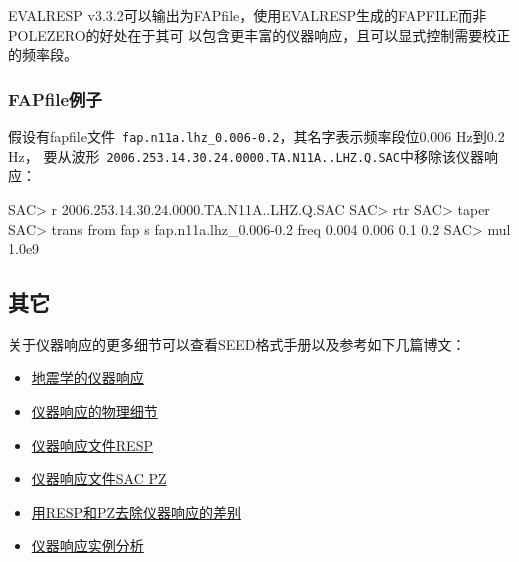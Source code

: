EVALRESP v3.3.2可以输出为FAPfile，使用EVALRESP生成的FAPFILE而非POLEZERO的好处在于其可
以包含更丰富的仪器响应，且可以显式控制需要校正的频率段。

\subsubsection{FAPfile例子}
假设有fapfile文件~\lstinline{fap.n11a.lhz_0.006-0.2}，其名字表示频率段位0.006 Hz到0.2 Hz，
要从波形~\lstinline{2006.253.14.30.24.0000.TA.N11A..LHZ.Q.SAC}中移除该仪器响应：
\begin{SACCode}
SAC> r 2006.253.14.30.24.0000.TA.N11A..LHZ.Q.SAC
SAC> rtr
SAC> taper
SAC> trans from fap s fap.n11a.lhz_0.006-0.2 freq 0.004 0.006 0.1 0.2
SAC> mul 1.0e9
\end{SACCode}

\subsection{其它}

关于仪器响应的更多细节可以查看SEED格式手册以及参考如下几篇博文：
\begin{itemize}
\item \href{http://seisman.info/instrumental-response-in-seismology.html}{地震学的仪器响应}
\item \href{http://seisman.info/physical-details-of-instrumental-response.html}{仪器响应的物理细节}
\item \href{http://seisman.info/simple-analysis-of-resp.html}{仪器响应文件RESP}
\item \href{http://seisman.info/simple-analysis-of-sac-pz.html}{仪器响应文件SAC PZ}
\item \href{http://seisman.info/difference-between-resp-and-pz-while-deconvolution.html}{用RESP和PZ去除仪器响应的差别}
\item \href{http://seisman.info/deep-analysis-of-response.html}{仪器响应实例分析}
\end{itemize}
